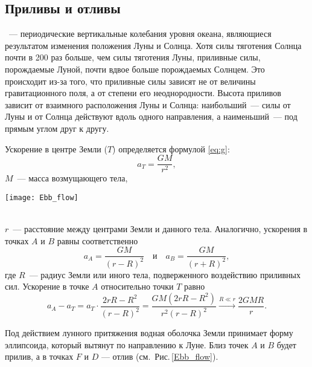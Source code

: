 \subsection{Приливы и отливы}

~--- периодические вертикальные колебания уровня океана, являющиеся результатом изменения положения Луны и Солнца. Хотя силы тяготения Солнца почти в 200 раз больше, чем силы тяготения Луны, приливные силы, порождаемые Луной, почти вдвое больше порождаемых Солнцем. Это происходит из-за того, что приливные силы зависят не от величины гравитационного поля, а от степени его неоднородности. Высота приливов зависит от взаимного расположения Луны и Солнца: наибольший~---  силы от Луны и от Солнца действуют вдоль одного направления, а наименьший~--- под прямым углом друг к другу.

\begin{minipage}{.24\tw}
Ускорение в центре Земли ($T$) определяется формулой \eqref{eq:g}:
\begin{equation*}
	a_T=\frac{G M}{r^2},
\end{equation*}
$M$~--- масса возмущающего тела,
\end{minipage}
\hfill
\begin{minipage}{0.74\tw}
	\vspace{-.5pc}
	\texttt{[image: Ebb\_flow]}
	\label{Ebb_flow}
\end{minipage}\\[-0.5pc]

$r$~--- расстояние между центрами Земли и данного тела. Аналогично, ускорения в точках $A$ и $B$ равны соответственно
\begin{equation}
	a_A = \frac{G M}{(r - R)^2} \quad \text{и} \quad a_B = \frac{GM}{(r + R)^2},
\end{equation}
где $R$~--- радиус Земли или иного тела, подверженного воздействию приливных сил. Ускорение в точке $A$ относительно точки $T$ равно
\begin{equation}
	a_A - a_T = a_T \cdot \frac{2 r R - R^2}{(r - R)^2} = \frac{GM \left(2 r R - R^2 \right)}{r^2 (r - R)^2} \xrightarrow{R \ll r} \frac{2 G M R}{r}.
	\label{eq:ebb-force}
\end{equation}

Под действием лунного притяжения водная оболочка Земли принимает форму 
эллипсоида, который вытянут по направлению к Луне. Близ точек $A$ и $B$ будет 
прилив, а в точках $F$ и $D$ --- отлив (см.~Рис.\,\ref{Ebb_flow}).